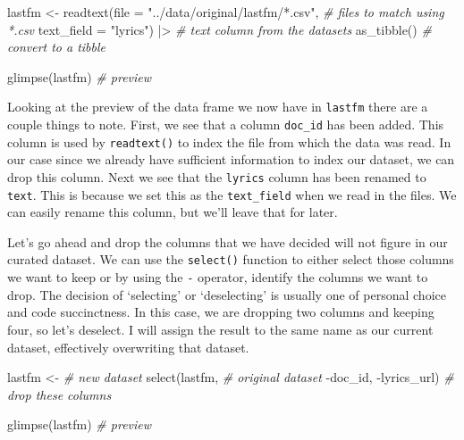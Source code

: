 \documentclass[
  letterpaper,
  DIV=11,
  numbers=noendperiod]{scrreport}
\newenvironment{Shaded}{\begin{snugshade}}{\end{snugshade}}
\newcommand{\AttributeTok}[1]{\textcolor[rgb]{0.00,0.00,0.00}{#1}}
\newcommand{\CommentTok}[1]{\textcolor[rgb]{0.00,0.00,0.00}{\textit{#1}}}
\newcommand{\FunctionTok}[1]{\textcolor[rgb]{0.00,0.00,0.00}{#1}}
\newcommand{\NormalTok}[1]{\textcolor[rgb]{0.00,0.00,0.00}{#1}}
\newcommand{\OtherTok}[1]{\textcolor[rgb]{0.00,0.00,0.00}{#1}}
\newcommand{\SpecialCharTok}[1]{\textcolor[rgb]{0.00,0.00,0.00}{#1}}
\newcommand{\StringTok}[1]{\textcolor[rgb]{0.00,0.00,0.00}{#1}}
\theoremstyle{definition}
\theoremstyle{remark}
\begin{document}
\begin{Shaded}
\begin{Highlighting}[]
\NormalTok{lastfm }\OtherTok{\textless{}{-}} 
  \FunctionTok{readtext}\NormalTok{(}\AttributeTok{file =} \StringTok{"../data/original/lastfm/*.csv"}\NormalTok{, }\CommentTok{\# files to match using *.csv}
           \AttributeTok{text\_field =} \StringTok{"lyrics"}\NormalTok{) }\SpecialCharTok{|\textgreater{}} \CommentTok{\# text column from the datasets}
  \FunctionTok{as\_tibble}\NormalTok{() }\CommentTok{\# convert to a tibble}

\FunctionTok{glimpse}\NormalTok{(lastfm) }\CommentTok{\# preview}
\end{Highlighting}
\end{Shaded}

Looking at the preview of the data frame we now have in \texttt{lastfm}
there are a couple things to note. First, we see that a column
\texttt{doc\_id} has been added. This column is used by
\texttt{readtext()} to index the file from which the data was read. In
our case since we already have sufficient information to index our
dataset, we can drop this column. Next we see that the \texttt{lyrics}
column has been renamed to \texttt{text}. This is because we set this as
the \texttt{text\_field} when we read in the files. We can easily rename
this column, but we'll leave that for later.

Let's go ahead and drop the columns that we have decided will not figure
in our curated dataset. We can use the \texttt{select()} function to
either select those columns we want to keep or by using the \texttt{-}
operator, identify the columns we want to drop. The decision of
`selecting' or `deselecting' is usually one of personal choice and code
succinctness. In this case, we are dropping two columns and keeping
four, so let's deselect. I will assign the result to the same name as
our current dataset, effectively overwriting that dataset.

\begin{Shaded}
\begin{Highlighting}[]
\NormalTok{lastfm }\OtherTok{\textless{}{-}} \CommentTok{\# new dataset}
  \FunctionTok{select}\NormalTok{(lastfm, }\CommentTok{\# original dataset}
         \SpecialCharTok{{-}}\NormalTok{doc\_id, }\SpecialCharTok{{-}}\NormalTok{lyrics\_url) }\CommentTok{\# drop these columns}

\FunctionTok{glimpse}\NormalTok{(lastfm) }\CommentTok{\# preview}
\end{Highlighting}
\end{Shaded}
\end{document}
